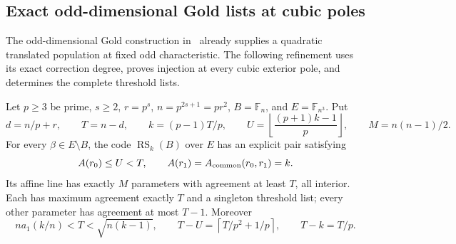 \subsection{Exact odd-dimensional Gold lists at cubic poles}
\label{sec:odd-gold-exact-classification}
The odd-dimensional Gold construction in~\cite{binary-counterexamples}
already supplies a quadratic translated population at fixed odd
characteristic. The following refinement uses its exact correction
degree, proves injection at every cubic exterior pole, and determines
the complete threshold lists.

\begin{theorem}\label{thm:odd-gold-exact-classification}
Let $p\ge3$ be prime, $s\ge2$, $r=p^s$, $n=p^{2s+1}=pr^2$,
$B=\mathbb F_n$, and $E=\mathbb F_{n^3}$. Put
\[
 d=n/p+r,\qquad T=n-d,\qquad k=(p-1)T/p,\qquad
 U=\left\lfloor\frac{(p+1)k-1}{p}\right\rfloor,\qquad
 M=n(n-1)/2.
\]
For every $\beta\in E\setminus B$, the code
$\operatorname{RS}_k(B)$ over $E$ has an explicit pair satisfying
\[
 A(r_0)\le U<T,\qquad A(r_1)=A_{\rm common}(r_0,r_1)=k.
\]
Its affine line has exactly $M$ parameters with agreement at least
$T$, all interior. Each has maximum agreement exactly $T$ and a
singleton threshold list; every other parameter has agreement at
most $T-1$. Moreover
\[
 na_1(k/n)<T<\sqrt{n(k-1)},\qquad
 T-U=\left\lceil T/p^2+1/p\right\rceil,\qquad T-k=T/p.
\]
\end{theorem}
